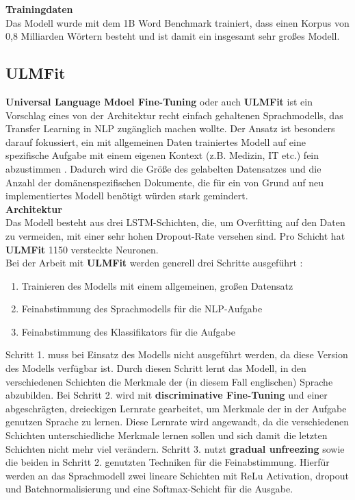 \textbf{Trainingdaten}\\
Das Modell wurde mit dem 1B Word Benchmark trainiert, dass einen Korpus von 0,8 Milliarden W\"ortern besteht und ist damit ein insgesamt sehr gro{\ss}es Modell.


\subsection{ULMFit}
\textbf{Universal Language Mdoel Fine-Tuning} oder auch \textbf{ULMFit} ist ein Vorschlag eines von der Architektur recht einfach gehaltenen Sprachmodells, das Transfer Learning in NLP zug\"anglich machen wollte. Der Ansatz ist besonders darauf fokussiert, ein mit allgemeinen Daten trainiertes Modell auf eine spezifische Aufgabe mit einem eigenen Kontext (z.B. Medizin, IT etc.) fein abzustimmen \cite{ulm}. Dadurch wird die Gr\"o{\ss}e des gelabelten Datensatzes und die Anzahl der dom\"anenspezifischen Dokumente, die f\"ur ein von Grund auf neu implementiertes Modell ben\"otigt w\"urden stark gemindert.\\

\textbf{Architektur}\\
Das Modell besteht aus drei LSTM-Schichten, die, um Overfitting auf den Daten zu vermeiden, mit einer sehr hohen Dropout-Rate versehen sind. Pro Schicht hat \textbf{ULMFit} 1150 versteckte Neuronen.\\
Bei der Arbeit mit \textbf{ULMFit} werden generell drei Schritte ausgef\"uhrt \cite{ulm}:
\begin{enumerate}
\item Trainieren des Modells mit einem allgemeinen, gro{\ss}en Datensatz 
\item Feinabstimmung des Sprachmodells f\"ur die NLP-Aufgabe
\item Feinabstimmung des Klassifikators f\"ur die Aufgabe
\end{enumerate}
Schritt 1. muss bei Einsatz des Modells nicht ausgef\"uhrt werden, da diese Version des Modells verf\"ugbar ist. Durch diesen Schritt lernt das Modell, in den verschiedenen Schichten die Merkmale der (in diesem Fall englischen) Sprache abzubilden. Bei Schritt 2. wird mit \textbf{discriminative Fine-Tuning} und einer abgeschr\"agten, dreieckigen Lernrate gearbeitet, um Merkmale der in der Aufgabe genutzen Sprache zu lernen. Diese Lernrate wird angewandt, da die verschiedenen Schichten unterschiedliche Merkmale lernen sollen und sich damit die letzten Schichten nicht mehr viel ver\"andern. Schritt 3. nutzt \textbf{gradual unfreezing} sowie die beiden in Schritt 2. genutzten Techniken f\"ur die Feinabstimmung. Hierf\"ur werden an das Sprachmodell zwei lineare Schichten mit ReLu Activation, dropout und Batchnormalisierung und eine Softmax-Schicht f\"ur die Ausgabe.\\

